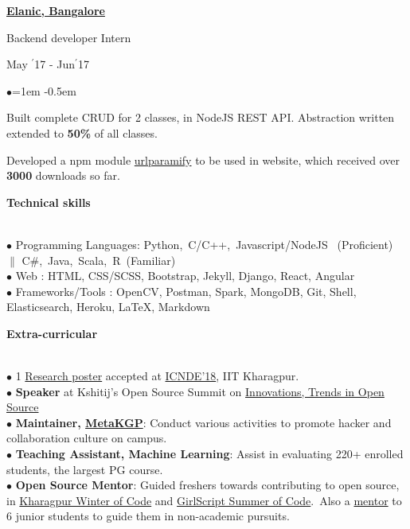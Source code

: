 \documentclass[11pt, a4paper]{resume}
\newcommand{\important}[1]{
	\textcolor{mypurple}{#1}
}
\newcommand{\fillit}[1]{
	\leavevmode\xleaders\hbox{#1}\hfill\kern0pt
}
\newcommand{\sectionTitle}[1]{
	\begin{Large}
    	\important{\textbf{#1}} 
    \end{Large}
    \important{\rlap{\rule[.5ex]{\linegoal}{0.5pt}}{}}
     \vspace{0.1em}\\
}
\newcommand{\textbox}[1]{
  \parbox{.333\textwidth}{#1}
}
\newenvironment{Jobsection}[3]{ %
\noindent\textbox{\bf #1\hfill}\textbox{\hfil #2\hfil}\textbox{\hfill #3}
  \begin{list}{$\bullet$}{\leftmargin=1em} %
   \itemsep -0.5em \vspace{-0.5em} %
  }{
  \end{list}
  \vspace{0.2em} %
}
\begin{document}
\begin{Jobsection}{\href{https://drive.google.com/file/d/0B5iU6cWw36rOVWZIcllPY3RSd2c/view?usp=sharing}{Elanic, Bangalore}}{Backend developer Intern}{ May $^{\prime}$17 - Jun$^{\prime}$17}
\item Built complete CRUD for 2 classes, in NodeJS REST API. Abstraction written extended to {\bf 50\%} of all classes.
\item Developed a npm module \href{https://www.npmjs.com/package/urlparamify}{urlparamify} to be used in website, which received over {\bf 3000} downloads so far.
\end{Jobsection}

\sectionTitle{Technical skills}
$\bullet$ Programming Languages: Python,\, C/C++,\, Javascript/NodeJS \, (Proficient)\, $\|$ C\#,\, Java,\, Scala,\, R\, (Familiar) \\
$\bullet$ Web : HTML, CSS/SCSS, Bootstrap, Jekyll, Django, React, Angular \\
$\bullet$  Frameworks/Tools
: OpenCV, Postman, Spark, MongoDB, Git, Shell, Elasticsearch, Heroku, LaTeX, Markdown

\sectionTitle{Extra-curricular}
$\bullet$ 1 \href{https://drive.google.com/file/d/1fCH2AAAHWp5JLwQxLNGoOYoGnyWrolHf/view?usp=sharing}{Research poster} accepted at \href{http://cse.iitkgp.ac.in/conf/NSDE/sds/ICNDE2018/pages/selected.html}{ICNDE'18}, IIT Kharagpur. \\
$\bullet$ {\bf Speaker} at Kshitij's Open Source Summit on \href{https://www.youtube.com/watch?v=lk4ciY3NSbA}{Innovations, Trends in Open Source}\\
$\bullet$ {\bf Maintainer, \href{http://metakgp.github.io}{MetaKGP}}: Conduct various activities to promote hacker and collaboration culture on campus.\\
$\bullet$ {\bf Teaching Assistant, Machine Learning}: Assist in evaluating 220+ enrolled students, the largest PG course.\\
$\bullet$ {\bf Open Source Mentor}: Guided freshers towards contributing to open source, in \href{https://kwoc.kossiitkgp.in/}{Kharagpur Winter of Code} and \href{https://gssoc.tech/projects.html#facebook-archive}{GirlScript Summer of Code}.\, Also a \href{https://drive.google.com/file/d/0B5iU6cWw36rOc0gzcjZPRTd5SkU/view?usp=sharing}{mentor} to 6 junior students to guide them in non-academic pursuits.
\end{document}
